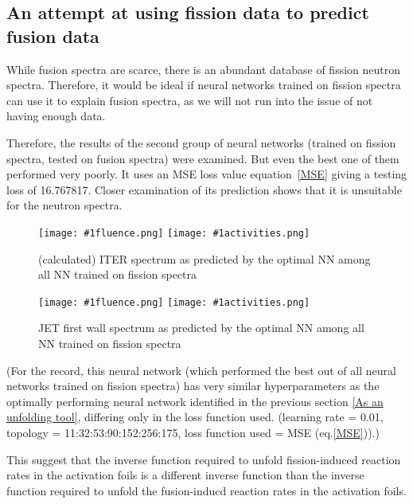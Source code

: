 \documentclass[a4paper, 12pt]{article}
\newcommand{\fluenceandactivities}[1]{
\texttt{[image: \#1fluence.png]}
\texttt{[image: \#1activities.png]}
}
\begin{document}
\subsection{An attempt at using fission data to predict fusion data}
While fusion spectra are scarce, there is an abundant database of fission neutron spectra. Therefore, it would be ideal if neural networks trained on fission spectra can use it to explain fusion spectra, as we will not run into the issue of not having enough data.

Therefore, the results of the second group of neural networks (trained on fission spectra, tested on fusion spectra) were examined. But even the best one of them performed very poorly. It uses an MSE loss value equation~\ref{MSE} giving a testing loss of 16.767817. Closer examination of its prediction shows that it is unsuitable for the neutron spectra.

\begin{figure}[H]
\centering
\fluenceandactivities{/home/ocean/Documents/GitHubDir/unfolding/unfolding/unfoldingsuite/neuralnetwork/realoutputEarlyStopping/SelectedNNreplicated/fission-fusion/0927_0226_5_layer_test_mse_1_test_007_}
\caption{(calculated) ITER spectrum as predicted by the optimal NN among all NN trained on fission spectra} \label{fission-fusionBad}
\end{figure}

\begin{figure}[H]
\centering
\fluenceandactivities{/home/ocean/Documents/GitHubDir/unfolding/unfolding/unfoldingsuite/neuralnetwork/realoutputEarlyStopping/SelectedNNreplicated/fission-fusion/0927_0226_5_layer_test_mse_1_test_016_}
\caption{JET first wall spectrum as predicted by the optimal NN among all NN trained on fission spectra}\label{fission-fusionGood}
\end{figure}

(For the record, this neural network (which performed the best out of all neural networks trained on fission spectra) has very similar hyperparameters as the optimally performing neural network identified in the previous section \ref{As an unfolding tool}, differing only in the loss function used. (learning rate = 0.01, topology = 11:32:53:90:152:256:175, loss function used = MSE (eq.\ref{MSE})).)

This suggest that the inverse function required to unfold fission-induced reaction rates in the activation foils is a different inverse function than the inverse function required to unfold the fusion-inducd reaction rates in the activation foils.%
\end{document}
